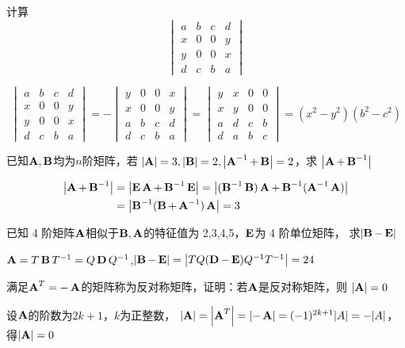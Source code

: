 \documentclass{article}
\begin{document}
\begin{examplle}[]
计算
\begin{equation*}
\begin{vmatrix}
a&b&c&d\\x&0&0&y\\
y&0&0&x\\d&c&b&a
\end{vmatrix}
\end{equation*}

\begin{equation*}
\begin{vmatrix}
a&b&c&d\\x&0&0&y\\
y&0&0&x\\d&c&b&a
\end{vmatrix}=-
\begin{vmatrix}
y&0&0&x\\x&0&0&y\\a&b&c&d\\d&c&b&a
\end{vmatrix}=
\begin{vmatrix}
y&x&0&0\\x&y&0&0\\
a&d&c&b\\d&a&b&c
\end{vmatrix}=(x^2-y^2)(b^2-c^2)
\end{equation*}
\end{examplle}

\begin{examplle}[]
已知\(\operatorname{\textbf{A}},\operatorname{\textbf{B}}\)均为\(n\)阶矩阵，若
\(\abs{\bA}=3,\abs{\bB}=2,\abs{\bA^{-1}+\bB}=2\)，求
\(\abs{\bA+\bB^{-1}}\)

\begin{align*}
\abs{\bA+\bB^{-1}}&=\abs{\bE\bA+\bB^{-1}\bE}=\abs{(\bB^{-1}\bB)\bA+\bB^{-1}(\bA^{-1}\bA)}\\
&=\abs{\bB^{-1}(\bB+\bA^{-1})\bA}=3
\end{align*}
\end{examplle}

\begin{examplle}[]
已知 4 阶矩阵\(\operatorname{\textbf{A}}\)相似于\(\operatorname{\textbf{B}},\operatorname{\textbf{A}}\)的特征值为 2,3,4,5，\(\operatorname{\textbf{E}}\)为 4 阶单位矩阵，
求\(\abs{\bB-\bE}\)

\(\operatorname{\textbf{A}}=T\operatorname{\textbf{B}} T^{-1}=Q\operatorname{\textbf{D}} Q^{-1}\),\(\abs{\bB-\bE}=\abs{TQ(\bD-\bE)Q^{-1}T^{-1}}=24\)
\end{examplle}

\begin{examplle}[]
满足\(\operatorname{\textbf{A}}^T=-\operatorname{\textbf{A}}\)的矩阵称为反对称矩阵，证明：若\(\operatorname{\textbf{A}}\)是反对称矩阵，则
\(\abs{\bA}=0\)

设\(\operatorname{\textbf{A}}\)的阶数为\(2k+1\)，\(k\)为正整数，
\(\abs{\bA}=\abs{\bA^T}=\abs{-\bA}=(-1)^{2k+1}\abs{A}=-\abs{A}\)，得\(\abs{\bA}=0\)
\end{examplle}
\end{document}
